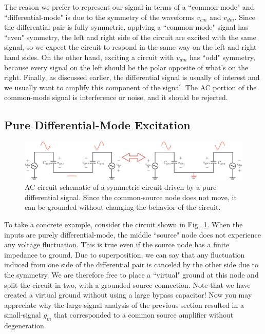 The reason we prefer to represent our signal in terms of a ``common-mode" and ``differential-mode" is due to the symmetry of the waveforms $v_{cm}$ and $v_{dm}$.  Since the differential pair is fully symmetric, applying a ``common-mode" signal has ``even" symmetry, the left and right side of the circuit are excited with the same signal, so we expect the circuit to respond in the same way on the left and right hand sides.  On the other hand, exciting a circuit with $v_{dm}$ has ``odd" symmetry, because every signal on the left should be the polar opposite of what's on the right.	Finally, as discussed earlier, the differential signal is usually of interest and we usually want to amplify this component of the signal. The AC portion of the common-mode signal is interference or noise, and it should be rejected.  
\subsection{Pure Differential-Mode Excitation}
\begin{figure}[tb]
\begin{center}
\includegraphics[width=\columnwidth]{DM_model.pdf}
\end{center}
\caption{AC circuit schematic of a symmetric circuit driven by a pure differential signal.  Since the common-source node does not move, it can be grounded without changing the behavior of the circuit.} \label{fig:DM_model.pdf}
\end{figure}

To take a concrete example, consider the circuit shown in Fig.~\ref{fig:DM_model.pdf}. When the inputs are purely differential-mode, the middle ``source" node does not experience any voltage fluctuation.  This is true even if the source node has a finite impedance to ground.  Due to superposition, we can say that any fluctuation induced from one side of the differential pair is canceled by the other side due to the symmetry. We are therefore free to place a ``virtual" ground at this node and split the circuit in two, with a grounded source connection.  Note that we have created a virtual ground without using a large bypass capacitor!  Now you may appreciate why the large-signal analysis of the previous section resulted in a small-signal $g_m$ that corresponded to a common source amplifier without degeneration. 
